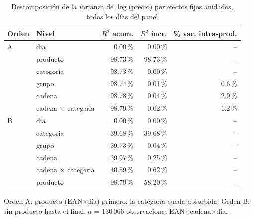 \begin{table}[htbp]
\caption{Descomposici\'on de la varianza de $\log$(precio) por efectos fijos anidados, todos los d\'ias del panel}
\label{tab:varianza}
\centering\scriptsize\setlength{\tabcolsep}{3pt}
\begin{tabular}{@{}llrrr@{}}
\toprule
Orden & Nivel & $R^2$ acum. & $R^2$ incr. & \% var. intra-prod. \\
\midrule
A & dia & 0.00\,\% & 0.00\,\% & -- \\
 & producto & 98.73\,\% & 98.73\,\% & -- \\
 & categoria & 98.73\,\% & 0.00\,\% & -- \\
 & grupo & 98.74\,\% & 0.01\,\% & 0.6\,\% \\
 & cadena & 98.78\,\% & 0.04\,\% & 2.9\,\% \\
 & cadena $\times$ categoria & 98.79\,\% & 0.02\,\% & 1.2\,\% \\
\midrule
B & dia & 0.00\,\% & 0.00\,\% & -- \\
 & categoria & 39.68\,\% & 39.68\,\% & -- \\
 & grupo & 39.73\,\% & 0.04\,\% & -- \\
 & cadena & 39.97\,\% & 0.25\,\% & -- \\
 & cadena $\times$ categoria & 40.59\,\% & 0.62\,\% & -- \\
 & producto & 98.79\,\% & 58.20\,\% & -- \\
\bottomrule\end{tabular}
\par\smallskip\raggedright\scriptsize Orden A: producto (EAN$\times$d\'ia) primero; la categor\'ia queda absorbida. Orden B: sin producto hasta el final. $n$ = 130\,066 observaciones EAN$\times$cadena$\times$d\'ia.
\end{table}
